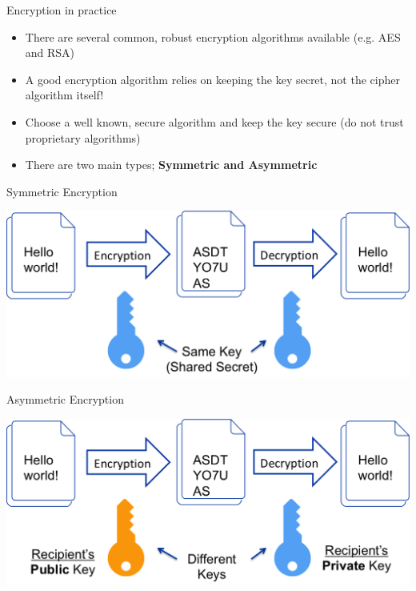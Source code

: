 \documentclass{beamer}
\begin{document}
\begin{frame}{Encryption in practice}
\begin{itemize}
\item There are several common, robust encryption algorithms available (e.g. AES and RSA) 
\item A good encryption algorithm relies on keeping the key secret, not the cipher algorithm itself!
\item Choose a well known, secure algorithm and keep the key secure (do not trust proprietary algorithms)
\item There are two main types; \textbf{Symmetric and Asymmetric} 
\end{itemize}
\end{frame}

\begin{frame}{Symmetric Encryption}
\begin{center}
\includegraphics[width=0.8\linewidth]{symmetric-encryption.png}
\end{center}
\end{frame}

\begin{frame}{Asymmetric Encryption}
\begin{center}
\includegraphics[width=0.8\linewidth]{asymmetric-encryption.png}
\end{center}
\end{frame}
\end{document}

